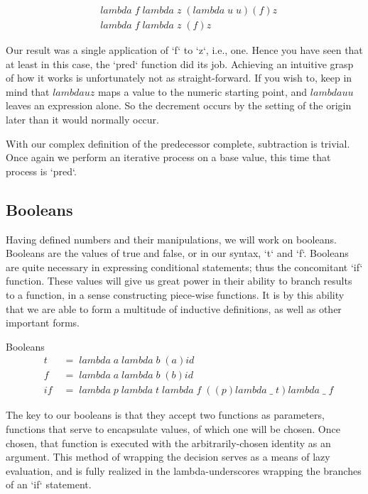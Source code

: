 \begin{align*}
& lambda \; f \; lambda \; z \; (lambda \; u \; u)(f)z
\\& lambda \; f \; lambda \; z \; (f)z
\end{align*}

Our result was a single application of `f` to `z`, i.e., one. Hence you have seen 
that at least in this case, the `pred` function did its job. Achieving an
intuitive grasp of how it works is unfortunately not as straight-forward. If you
wish to, keep in mind that $lambda u z$ maps a value to the numeric starting
point, and $lambda u u$ leaves an expression alone. So the decrement occurs by
the setting of the origin later than it would normally occur.

With our complex definition of the predecessor complete, subtraction is trivial.
Once again we perform an iterative process on a base value, this time that process 
is `pred`.

\subsection{Booleans}
Having defined numbers and their manipulations, we will work on booleans. Booleans 
are the values of true and false, or in our syntax, `t` and `f`. Booleans are
quite necessary in expressing conditional statements; thus the concomitant `if`
function. These values will give us great power in their ability to branch results 
to a function, in a sense constructing piece-wise functions. It is by this ability 
that we are able to form a multitude of inductive definitions, as well as other 
important forms.

Booleans
\begin{align*}
& t \; &= \; lambda \; a \; lambda \; b \; (a)id
\\& f \; &= \; lambda \; a \; lambda \; b \; (b)id
\\& if \; &= \; lambda \; p \; lambda \; t \; lambda \; f \; ((p)lambda \; \_ \; t)lambda \; \_ \; f
\end{align*}

The key to our booleans is that they accept two functions as parameters, functions 
that serve to encapsulate values, of which one will be chosen. Once chosen, that 
function is executed with the arbitrarily-chosen identity as an argument. This
method of wrapping the decision serves as a means of lazy evaluation, and is fully 
realized in the lambda-underscores wrapping the branches of an `if` statement.

